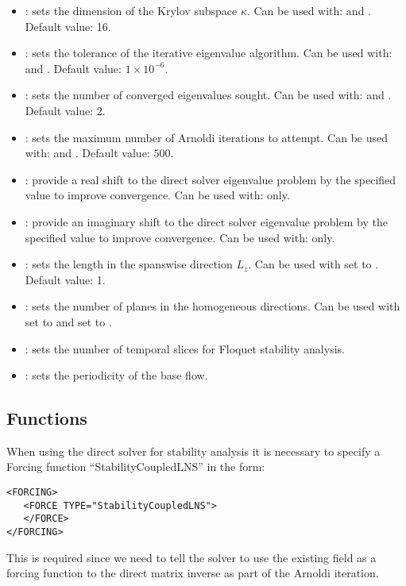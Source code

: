\begin{itemize}
\item {}: sets the dimension of the Krylov subspace $\kappa$. Can be used with:  and . Default value: 16.
\item {}: sets the tolerance of the iterative eigenvalue algorithm. Can be used with:  and . Default value: $1\times10^{-6}$.
\item {}: sets the number of converged eigenvalues sought. Can be used with:  and . Default value: $2$.
\item {}: sets the maximum number of Arnoldi iterations to attempt. Can be used with:  and . Default value: $500$.
\item {}: provide a real shift to the direct solver eigenvalue problem by the specified value to improve convergence. Can be used with:  only.
\item {}: provide an imaginary shift to the direct solver eigenvalue problem by the specified value to improve convergence. Can be used with:  only.
\item {}:  sets the length in the spanswise direction $L_z$. Can be used with  set to . Default value: 1.
\item {}: sets the number of planes in the homogeneous directions. Can be used with  set to  and  set to .
\item {}: sets the number of temporal slices for Floquet stability analysis.
\item {}: sets the periodicity of the base flow.
\end{itemize}

\subsection{Functions}
When using the direct solver for stability analysis it is necessary to specify a Forcing function ``StabilityCoupledLNS'' in the form:
\begin{lstlisting}[style=XMLStyle]
<FORCING>
   <FORCE TYPE="StabilityCoupledLNS">
   </FORCE>
</FORCING>
\end{lstlisting}

This is required since we need to tell the solver to use the existing
field as a forcing function to the direct matrix inverse as part of
the Arnoldi iteration.


